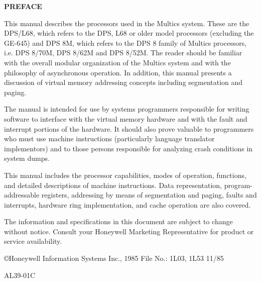 \begin{center}
\Large\bfseries PREFACE
\end{center}

This manual describes the processors used in the Multics system. These are the
DPS/L68, which refers to the DPS, L68 or older model processors (excluding the
GE-645) and DPS 8M, which refers to the DPS 8 family of Multics processors,
i.e. DPS 8/70M, DPS 8/62M and DPS 8/52M.  The reader should be familiar with
the overall modular organization of the Multics system and with the philosophy
of asynchronous operation. In addition, this manual presents a discussion of
virtual memory addressing concepts including segmentation and paging.


The manual is intended for use by systems programmers responsible for writing
software to interface with the virtual memory hardware and with the fault and
interrupt portions of the hardware. It should also prove valuable to
programmers who must use machine instructions (particularly language translator
implementors) and to those persons responsible for analyzing crash conditions
in system dumps.

This manual includes the processor capabilities, modes of operation, functions,
and detailed descriptions of machine instructions. Data representation,
program-addressable registers, addressing by means of segmentation and paging,
faults and interrupts, hardware ring implementation, and cache operation are
also covered.  

\vfill

\small
The information and specifications in this document are subject to change
without notice. Consult your Honeywell Marketing Representative for product or
service availability.

\copyright Honeywell Information Systems Inc., 1985 \hspace{1cm} File No.: 1L03, 1L53
\hfill 11/85

\hfill AL39-01C

\normalsize
